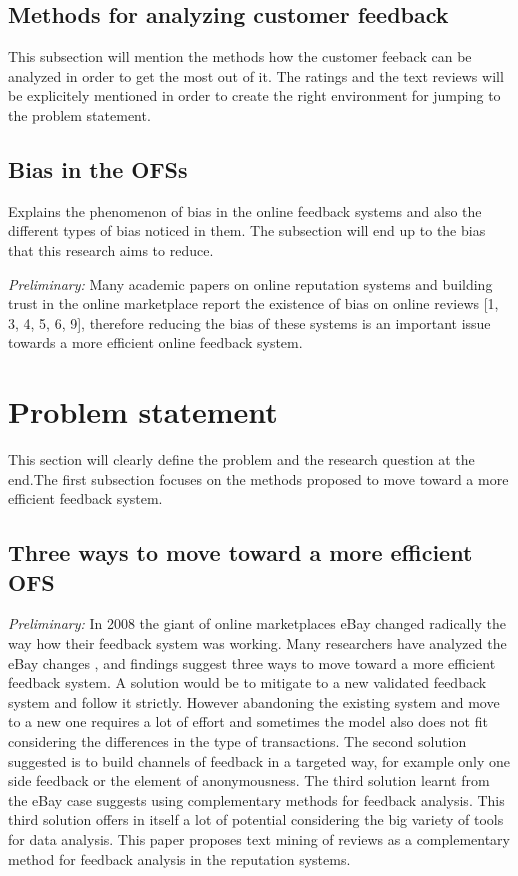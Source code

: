 \documentclass[a4paper, 11pt]{article}
\begin{document}
\subsection{Methods for analyzing customer feedback}
\label{subsec:feedbackmethods}
This subsection will mention the methods how the customer feeback can be analyzed in order to get the most out of it. The ratings and the text reviews will be explicitely mentioned in order to create the right environment for jumping to the problem statement.

\subsection{Bias in the OFSs}
\label{subsec:bias}
Explains the phenomenon of bias in the online feedback systems and also the different types of bias noticed in them. The subsection will end up to the bias that this research aims to reduce.

\textit{Preliminary:} Many academic papers on online reputation systems and building trust in the online marketplace report the existence of bias on online reviews [1, 3, 4, 5, 6, 9], therefore reducing the bias of these systems is an important issue towards a more efficient online feedback system. 

\section{Problem statement}
\label{sec:problemstatement}
This section will clearly define the problem and the research question at the end.The first subsection focuses on the methods proposed to move toward a more efficient feedback system.

\subsection{Three ways to move toward a more efficient OFS}
\textit{Preliminary:} In 2008 the giant of online marketplaces eBay changed radically the way how their feedback system was working. Many researchers have analyzed the eBay changes \cite{fradkin2016bias,resnick2006value,bolton2013engineering,dini2009buying,dellarocas2008sound}, and findings suggest three ways to move toward a more efficient feedback system. A solution would be to mitigate to a new validated feedback system and follow it strictly. However abandoning the existing system and move to a new one requires a lot of effort and sometimes the model also does not fit considering the differences in the type of transactions. The second solution suggested is to build channels of feedback in a targeted way, for example only one side feedback or the element of anonymousness. The third solution learnt from the eBay case suggests using complementary methods for feedback analysis. This third solution offers in itself a lot of potential considering the big variety of tools for data analysis. This paper proposes text mining of reviews as a complementary method for feedback analysis in the reputation systems. 
\end{document}
